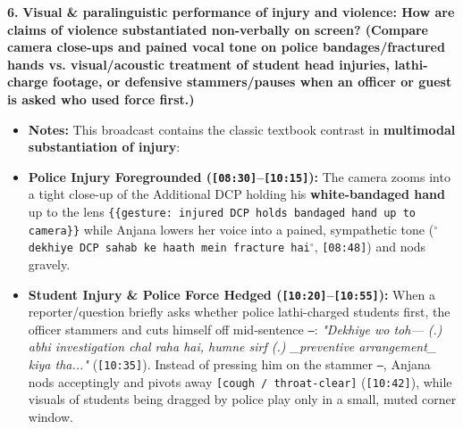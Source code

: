 \documentclass[10pt,a4paper]{article}
\begin{document}
\noindent\textbf{6.} \textbf{Visual \& paralinguistic performance of injury and violence: How are claims of violence substantiated non-verbally on screen? (Compare camera close-ups and pained vocal tone on police bandages/fractured hands vs. visual/acoustic treatment of student head injuries, lathi-charge footage, or defensive stammers/pauses when an officer or guest is asked who used force first.)}\par\smallskip
\begin{itemize}
  \item \textbf{Notes:}
This broadcast contains the classic textbook contrast in \textbf{multimodal substantiation of injury}:\par\smallskip
  \item \textbf{Police Injury Foregrounded (\texttt{[08:30]}--\texttt{[10:15]}):} The camera zooms into a tight close-up of the Additional DCP holding his \textbf{white-bandaged hand} up to the lens \texttt{\{\{gesture: injured DCP holds bandaged hand up to camera\}\}} while Anjana lowers her voice into a pained, sympathetic tone (\texttt{$^\circ$dekhiye DCP sahab ke haath mein fracture hai$^\circ$}, \texttt{[08:48]}) and nods gravely.
  \item \textbf{Student Injury \& Police Force Hedged (\texttt{[10:20]}--\texttt{[10:55]}):} When a reporter/question briefly asks whether police lathi-charged students first, the officer stammers and cuts himself off mid-sentence \texttt{---}: \textit{"Dekhiye wo toh--- (.) abhi investigation chal raha hai, humne sirf (.) \_preventive arrangement\_ kiya tha..."} (\texttt{[10:35]}). Instead of pressing him on the stammer \texttt{---}, Anjana nods acceptingly and pivots away \texttt{[cough / throat-clear]} (\texttt{[10:42]}), while visuals of students being dragged by police play only in a small, muted corner window.
\end{itemize}
\end{document}
